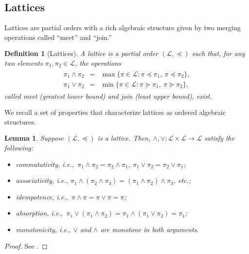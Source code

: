 \documentclass[conference]{ieeeconf}
\renewcommand{\preceq}{\preccurlyeq}
\renewcommand{\succeq}{\succcurlyeq}
\renewcommand{\L}{\mathcal{L}}
\newcommand{\join}{\vee}
\newcommand{\meet}{\wedge}
\newtheorem{lemma}{Lemma}
\newtheorem{definition}{Definition}
\begin{document}
\vspace{-0.25em}
\subsection{Lattices}
\vspace{-0.25em}

Lattices are partial orders with a rich algebraic structure given by two merging operations called ``meet'' and ``join.''
 
\begin{definition}[Lattices] \label{def:lattice}
    A \emph{lattice} is a partial order $(\L, \preceq)$ such that, for any two elements $\pi_1, \pi_2 \in \L$, the operations
    \begin{align*}
        \begin{aligned}
        \pi_1 \meet \pi_2 &=& \max\{ \pi \in \L: \pi \preceq \pi_1,~\pi \preceq \pi_2 \}, \\
        \pi_1 \join \pi_2 &=& \min\{ \pi \in \L: \pi \succeq \pi_1,~\pi \succeq \pi_2 \},       
        \end{aligned}
    \end{align*}
    called \emph{meet} (greatest lower bound) and \emph{join} (least upper bound), exist. 
\end{definition}

We recall a set of properties that characterize lattices as ordered algebraic structures.

\begin{lemma} \label{lem:lattice-axiom} 
    Suppose $(\L,\preceq)$ is a lattice. Then, $\meet, \join: \L \times \L \to \L$ satisfy the following:
    \begin{itemize}
        \item[(i)] \emph{commutativity}, i.e.,~$\pi_1 \meet \pi_2 = \pi_2 \meet \pi_1$, $\pi_1 \join \pi_2 = \pi_2 \join \pi_1$;
        \item[(ii)] \emph{associativity}, i.e., {\small $\pi_1 \meet (\pi_2 \meet \pi_3) = (\pi_1 \meet \pi_2) \meet \pi_3$}, etc.;
        \item[(iii)] \emph{idempotence}, i.e.,~$\pi \meet \pi = \pi \join \pi =  \pi$;
        \item[(iv)] \emph{absorption}, i.e.,~$\pi_1 \join \left( \pi_1 \meet \pi_2 \right) = \pi_1 \meet \left( \pi_1 \join \pi_2 \right) = \pi_1$;
        \item[(v)] \emph{monotonicity}, i.e., $\join$ and $\meet$ are monotone in both arguments.
    \end{itemize}
\end{lemma}
\begin{proof}
    See \cite[\S I.5 Lemma 1, \S I.5 Lemma 3]{birkhoff1940}.
\end{proof}
\end{document}

